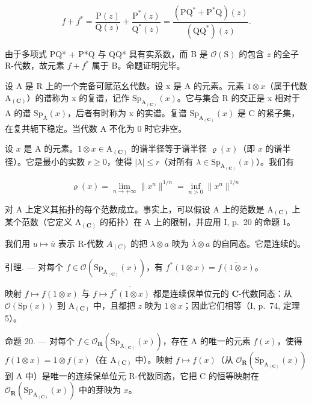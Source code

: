 \[
f + f ^ {*} = \frac {\mathrm{P} (z)}{\mathrm{Q} (z)} + \frac {\mathrm{P} ^ {*} (z)}{\mathrm{Q} ^ {*} (z)} = \frac {(\mathrm{PQ} ^ {*} + \mathrm{P} ^ {*} \mathrm{Q}) (z)}{(\mathrm{QQ} ^ {*}) (z)}.
\]

由于多项式 PQ* + P*Q 与 QQ* 具有实系数，而 B 是 \(\mathcal{O}(\mathrm{S})\) 的包含 \(z\) 的全子 R-代数，故元素 \(f + f^{*}\) 属于 B。命题证明完毕。

设 A 是 R 上的一个完备可赋范幺代数。设 x 是 A 的元素。元素 \(1 \otimes x\)（属于代数 \(\mathrm{A}_{(\mathbf{C})}\)）的谱称为 x 的复谱，记作 \(\mathrm{Sp}_{\mathrm{A}_{(\mathbf{C})}}(x)\)。它与集合 R 的交正是 x 相对于 A 的谱 \(\mathrm{Sp}_{\mathrm{A}}(x)\)，后者有时称为 x 的实谱。复谱 \(\mathrm{Sp}_{\mathrm{A}_{(\mathbf{C})}}(x)\) 是 C 的紧子集，在复共轭下稳定。当代数 A 不化为 0 时它非空。

设 \(x\) 是 A 的元素。\(1 \otimes x \in \mathrm{A}_{(\mathbf{C})}\) 的谱半径等于谱半径 \(\varrho(x)\)（即 \(x\) 的谱半径）。它是最小的实数 \(r \geqslant 0\)，使得 \(|\lambda| \leqslant r\)（对所有 \(\lambda \in \mathrm{Sp}_{\mathrm{A}_{(\mathbf{C})}}(x)\)）。我们有

\[
\varrho (x) = \lim _ {n \to + \infty} \| x ^ {n} \| ^ {1 / n} = \inf _ {n > 0} \| x ^ {n} \| ^ {1 / n}
\]

对 A 上定义其拓扑的每个范数成立。事实上，可以假设 A 上的范数是 \(\mathrm{A}_{(\mathbf{C})}\) 上某个范数（它定义 \(\mathrm{A}_{(\mathbf{C})}\) 的拓扑）在 A 上的限制，并应用 I, p.~20 的命题 1。

我们用 \(u \mapsto \overline{u}\) 表示 R-代数 \(A_{(C)}\) 的把 \(\lambda \otimes a\) 映为 \(\overline{\lambda} \otimes a\) 的自同态。它是连续的。

引理. --- 对每个 \(f \in \mathcal{O}(\mathrm{Sp}_{\mathrm{A}_{(\mathbf{C})}}(x))\)，有 \(f^{*}(1 \otimes x) = \overline{f(1 \otimes x)}\)。

映射 \(f \mapsto f(1 \otimes x)\) 与 \(f \mapsto \overline{f^*(1 \otimes x)}\) 都是连续保单位元的 \(\mathbf{C}\)-代数同态：从 \(\mathcal{O}(\mathrm{Sp}(x))\) 到 \(\mathrm{A}_{(\mathbf{C})}\) 中，且都把 \(z\) 映为 \(1 \otimes x\)；因此它们相等（I, p.~74, 定理 5）。

命题 20. --- 对每个 \(f \in \mathcal{O}_{\mathbf{R}}(\mathrm{Sp}_{\mathrm{A}_{(\mathbf{C})}}(x))\)，存在 A 的唯一的元素 \(f(x)\)，使得 \(f(1 \otimes x) = 1 \otimes f(x)\)（在 \(\mathrm{A}_{(\mathbf{C})}\) 中）。映射 \(f \mapsto f(x)\)（从 \(\mathcal{O}_{\mathbf{R}}(\mathrm{Sp}_{\mathrm{A}_{(\mathbf{C})}}(x))\) 到 A 中）是唯一的连续保单位元 R-代数同态，它把 C 的恒等映射在 \(\mathcal{O}_{\mathbf{R}}(\mathrm{Sp}_{\mathrm{A}_{(\mathbf{C})}}(x))\) 中的芽映为 \(x\)。

